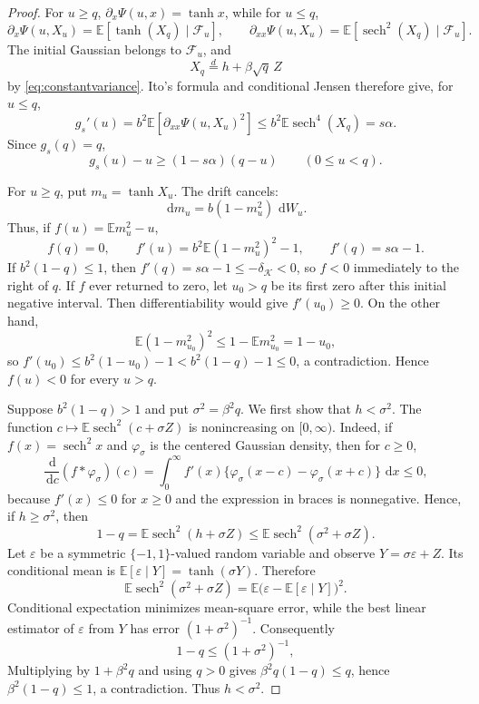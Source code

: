 \documentclass[11pt]{article}
\numberwithin{equation}{section}
\theoremstyle{plain}
\theoremstyle{definition}
\newcommand{\E}{\mathbb E}
\newcommand{\1}{\mathbf 1}
\newcommand{\sech}{\operatorname{sech}}
\newcommand{\cK}{\mathcal K}
\newcommand{\dd}{\,\mathrm d}
\begin{document}
\begin{proof}
For $u\ge q$,
$\partial_x\Psi(u,x)=\tanh x$, while for $u\le q$,
\[
 \partial_x\Psi(u,X_u)=\E[\tanh(X_q)\mid\mathcal F_u],
 \qquad
 \partial_{xx}\Psi(u,X_u)=\E[\sech^2(X_q)\mid\mathcal F_u].
\]
The initial Gaussian belongs to $\mathcal F_u$, and
\begin{equation}
 X_q\stackrel d=h+\beta\sqrt q\,Z
 \label{eq:Xq}
\end{equation}
by \eqref{eq:constantvariance}.  Ito's formula and conditional Jensen
therefore give, for $u\le q$,
\[
 g_s'(u)
 =b^2\E[\partial_{xx}\Psi(u,X_u)^2]
 \le b^2\E\sech^4(X_q)=s\alpha.
\]
Since $g_s(q)=q$,
\begin{equation}
 g_s(u)-u\ge(1-s\alpha)(q-u)
 \qquad(0\le u<q).
 \label{eq:leftstrict}
\end{equation}

For $u\ge q$, put $m_u=\tanh X_u$.  The drift cancels:
\begin{equation}
 \dd m_u=b(1-m_u^2)\,\dd W_u.
 \label{eq:mdiffusion}
\end{equation}
Thus, if $f(u)=\E m_u^2-u$,
\begin{equation}
 f(q)=0,\qquad f'(u)=b^2\E(1-m_u^2)^2-1,
 \qquad f'(q)=s\alpha-1.
 \label{eq:fprime}
\end{equation}
If $b^2(1-q)\le1$, then
$f'(q)=s\alpha-1\le-\delta_{\cK}<0$, so $f<0$ immediately to the
right of $q$.  If $f$ ever returned to zero, let $u_0>q$ be its first
zero after this initial negative interval.  Then differentiability
would give $f'(u_0)\ge0$.  On the other hand,
\[
 \E(1-m_{u_0}^2)^2\le1-\E m_{u_0}^2=1-u_0,
\]
so $f'(u_0)\le b^2(1-u_0)-1
<b^2(1-q)-1\le0$, a contradiction.  Hence $f(u)<0$ for every
$u>q$.

Suppose $b^2(1-q)>1$ and put $\sigma^2=\beta^2q$.  We first
show that $h<\sigma^2$.  The function
$c\mapsto\E\sech^2(c+\sigma Z)$ is nonincreasing on $[0,\infty)$.
Indeed, if $f(x)=\sech^2x$ and $\varphi_\sigma$ is the centered Gaussian
density, then for $c\ge0$,
\[
 \frac{\dd}{\dd c}(f*\varphi_\sigma)(c)
 =\int_0^\infty f'(x)
   \{\varphi_\sigma(x-c)-\varphi_\sigma(x+c)\}\,\dd x\le0,
\]
because $f'(x)\le0$ for $x\ge0$ and the expression in braces is
nonnegative.  Hence, if $h\ge\sigma^2$, then
\[
 1-q=\E\sech^2(h+\sigma Z)
 \le\E\sech^2(\sigma^2+\sigma Z).
\]
Let $\varepsilon$ be a symmetric $\{-1,1\}$-valued random variable
and observe $Y=\sigma\varepsilon+Z$.  Its conditional mean is
$\E[\varepsilon\mid Y]=\tanh(\sigma Y)$.  Therefore
\[
 \E\sech^2(\sigma^2+\sigma Z)
 =\E\bigl(\varepsilon-\E[\varepsilon\mid Y]\bigr)^2.
\]
Conditional expectation minimizes mean-square error, while the best
linear estimator of $\varepsilon$ from $Y$ has error
$(1+\sigma^2)^{-1}$.  Consequently
\[
 1-q\le(1+\sigma^2)^{-1},
\]
Multiplying by $1+\beta^2q$ and using $q>0$ gives
$\beta^2q(1-q)\le q$, hence $\beta^2(1-q)\le1$, a contradiction.  Thus $h<\sigma^2$.


\end{proof}
\end{document}
